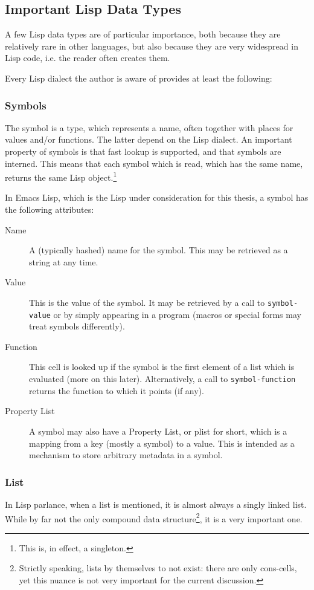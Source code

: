 \documentclass[a4paper]{article}
\begin{document}
\subsection{Important Lisp Data Types}
\label{sec:orgheadline13}
A few Lisp data types are of particular importance, both because they are
relatively rare in other languages, but also because they are very widespread in
Lisp code, i.e. the reader often creates them.

Every Lisp dialect the author is aware of provides at least the following:

\subsubsection{Symbols}
\label{sec:orgheadline11}
The symbol is a type, which represents a name, often together with places for
values and/or functions.  The latter depend on the Lisp dialect.  An important
property of symbols is that fast lookup is supported, and that symbols are
interned.  This means that each symbol which is read, which has the same name,
returns the same Lisp object.\footnote{This is, in effect, a singleton.}

In Emacs Lisp, which is the Lisp under consideration for this thesis, a symbol has
the following attributes:

\begin{description}
\item[{Name}] A (typically hashed) name for the symbol.  This may be retrieved as a
string at any time.
\item[{Value}] This is the value of the symbol.  It may be retrieved by a call to
\texttt{symbol-value} or by simply appearing in a program (macros or
special forms may treat symbols differently).
\item[{Function}] This cell is looked up if the symbol is the first element of a
list which is evaluated (more on this later).  Alternatively, a call to
\texttt{symbol-function} returns the function to which it points (if
any). 
\item[{Property List}] A symbol may also have a Property List, or plist for short,
which is a mapping from a key (mostly a symbol) to a value.  This is
intended as a mechanism to store arbitrary metadata in a symbol.
\end{description}

\subsubsection{List}
\label{sec:orgheadline12}
In Lisp parlance, when a list is mentioned, it is almost always a singly linked
list.  While by far not the only compound data structure\footnote{Strictly speaking,
lists by themselves to not exist: there are only cons-cells, yet this nuance is
not very important for the current discussion.}, it is a very important one.
\end{document}
